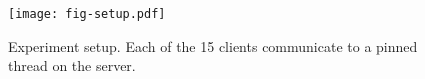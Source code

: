 \begin{figure}[t]
\texttt{[image: fig-setup.pdf]}
\caption{Experiment setup. Each of the 15 clients communicate to a pinned thread on the server.}
\label{fig:setup}
\end{figure}
